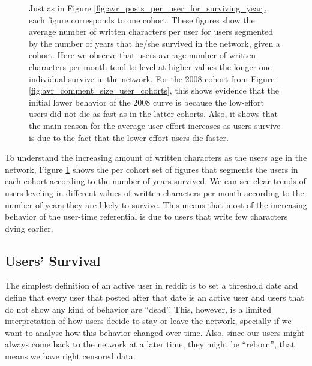 \begin{figure}[!tb]
\caption{Just as in Figure \ref{fig:avr_posts_per_user_for_surviving_year}, each figure corresponds to one cohort. These figures show the average number of written characters per user for users segmented by the number of years that he/she survived in the network, given a cohort. Here we observe that users average number of written characters per month tend to level at higher values the longer one individual survive in the network. For the 2008 cohort from Figure \ref{fig:avr_comment_size_user_cohorts}, this shows evidence that the initial lower behavior of the 2008 curve is because the low-effort users did not die as fast as in the latter cohorts. Also, it shows that the main reason for the average user effort increases as users survive is due to the fact that the lower-effort users die faster.}
\label{fig:avr_comment_length_user_for_surviving_year}
\end{figure}

To understand the increasing amount of written characters as the users age in the network, Figure \ref{fig:avr_comment_length_user_for_surviving_year} shows the per cohort set of figures that segments the users in each cohort according to the number of years survived. We can see clear trends of users leveling in different values of written characters per month according to the number of years they are likely to survive. This means that most of the increasing behavior of the user-time referential is due to users that write few characters dying earlier.

\subsection{Users' Survival}

The simplest definition of an active user in reddit is to set a threshold date and define that every user that posted after that date is an active user and users that do not show any kind of behavior are ``dead''. This, however, is a limited interpretation of how users decide to stay or leave the network, specially if we want to analyse how this behavior changed over time. Also, since our users might always come back to the network at a later time, they might be ``reborn'', that means we have right censored data.

